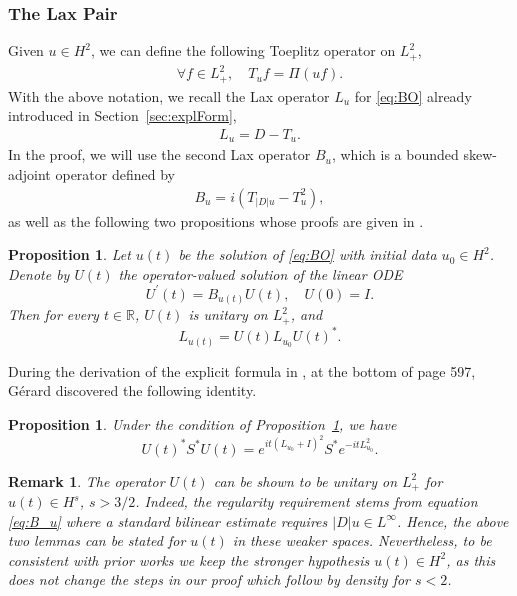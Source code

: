 \documentclass [11pt] {article}
\newtheorem{prop}[thm]{Proposition}
\newtheorem{rem}[thm]{Remark}
\begin{document}
\subsubsection{The Lax Pair}\label{sec:LaxPairs}
Given $u \in H^2$, we can define the following Toeplitz operator on $L_{+}^2$,
\begin{align*}
\forall f \in L_{+}^2, \quad T_u f=\Pi(u f).
\end{align*}
With the above notation, we recall the Lax operator $L_{u}$ for \eqref{eq:BO} already introduced in Section~\ref{sec:explForm},
\begin{align*}
L_u=D - T_u.
\end{align*}
In the proof, we will use the second Lax operator $B_u$, which is a bounded skew-adjoint operator defined by
\begin{align}\label{eq:B_u}
B_u =i\left(T_{|D| u}-T_u^2\right),
\end{align}
as well as the following two propositions whose proofs are given in \cite{G}.
\begin{prop}{\cite[Corollary 3]{G}}
\label{lemma 4.2}
Let $u(t)$ be the solution of \eqref{eq:BO} with initial data $u_0 \in H^2$. Denote by $U(t)$ the operator-valued solution of the linear ODE
\[
U^{\prime}(t)=B_{u(t)} U(t), \quad U(0)=I.
\]
Then  for every $t \in \mathbb{R}$, $U(t)$ is unitary on $L_{+}^2$, and
\[
L_{u(t)}=U(t) L_{u_0} U(t)^*.
\]
\end{prop}
\noindent During the derivation of the explicit formula in \cite[Section 2]{G},
at the bottom of page 597, Gérard discovered the following identity.
\begin{prop}
\label{lemma 4.3}
Under the condition of Proposition~\ref{lemma 4.2}, we have
\[ 
U(t)^* S^* U(t)=e^{i t\left(L_{u_0}+I\right)^2} S^* e^{-i t L_{u_0}^2}.
\]
\end{prop}
\begin{rem}
The operator $U(t)$ can be shown to be unitary on $L^2_{+}$ for $u(t) \in H^s$, $s>3/2$. Indeed, the regularity requirement stems from equation \eqref{eq:B_u} where a standard bilinear estimate requires $|D|u \in L^\infty$. Hence, the above two lemmas can be stated for $u(t)$ in these weaker spaces. Nevertheless, to be consistent with prior works we keep the stronger hypothesis $u(t) \in H^2$, as this does not change the steps in our proof which follow by density for $s<2$.
\end{rem}
\end{document}
